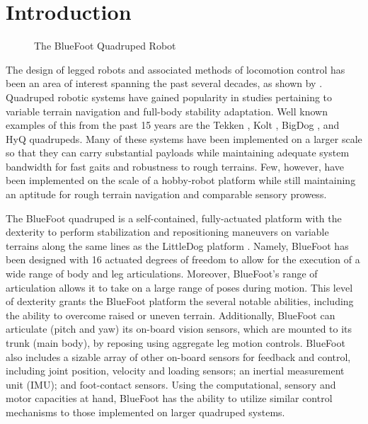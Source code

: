 \chapter{Introduction}
	\label{ch::introduction}
	
	\begin{figure}[h!]
		\centering
		\caption{The BlueFoot Quadruped Robot}
		\label{fig::bluefoot_glamour}
	\end{figure}

		The design of legged robots and associated methods of locomotion control has been an area of interest spanning the past several decades, as shown by \cite{McGhee1965,Hodgins1991,Altendorfer2001,Kolter2008,Wieber2015}. Quadruped robotic systems have gained popularity in studies pertaining to variable terrain navigation and full-body stability adaptation. Well known examples of this from the past 15 years are the Tekken \cite{Fukuoka2003}, Kolt \cite{Estremera2006}, BigDog \cite{BigDog2008}, and HyQ \cite{Semini2010_PHD} quadrupeds. Many of these systems have been implemented on a larger scale so that they can carry substantial payloads while maintaining adequate system bandwidth for fast gaits and robustness to rough terrains. Few, however, have been implemented on the scale of a hobby-robot platform while still maintaining an aptitude for rough terrain navigation and comparable sensory prowess.

		The BlueFoot quadruped is a self-contained, fully-actuated platform with the dexterity to perform stabilization and repositioning maneuvers on variable terrains along the same lines as the LittleDog platform \cite{Rebula2007}. Namely, BlueFoot has been designed with 16 actuated degrees of freedom to allow for the execution of a wide range of body and leg articulations. Moreover, BlueFoot's range of articulation allows it to take on a large range of poses during motion. This level of dexterity grants the BlueFoot platform the several notable abilities, including the ability to overcome raised or uneven terrain. Additionally, BlueFoot can articulate (\IE pitch and yaw) its on-board vision sensors, which are mounted to its trunk (main body), by reposing using aggregate leg motion controls. BlueFoot also includes a sizable array of other on-board sensors for feedback and control, including joint position, velocity and loading sensors; an inertial measurement unit (IMU); and foot-contact sensors. Using the computational, sensory and motor capacities at hand, BlueFoot has the ability to utilize similar control mechanisms to those implemented on larger quadruped systems. 

